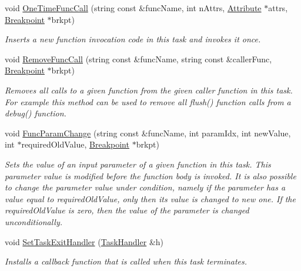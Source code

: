 \begin{DoxyCompactItemize}
void \hyperlink{class_model_1_1_task_ae0413fd63f38721da68b6c425f18feaf}{One\-Time\-Func\-Call} (string const \&func\-Name, int n\-Attrs, \hyperlink{class_common_1_1_attribute}{Attribute} $\ast$attrs, \hyperlink{class_common_1_1_breakpoint}{Breakpoint} $\ast$brkpt)
\begin{DoxyCompactList}\small\item\em Inserts a new function invocation code in this task and invokes it once. \end{DoxyCompactList}\item 
void \hyperlink{class_model_1_1_task_a6f5361d812cf7958d151736734762652}{Remove\-Func\-Call} (string const \&func\-Name, string const \&caller\-Func, \hyperlink{class_common_1_1_breakpoint}{Breakpoint} $\ast$brkpt)
\begin{DoxyCompactList}\small\item\em Removes all calls to a given function from the given caller function in this task. For example this method can be used to remove all flush() function calls from a debug() function. \end{DoxyCompactList}\item 
void \hyperlink{class_model_1_1_task_a09f3bb2f03a05d8d60fb391b0cb40249}{Func\-Param\-Change} (string const \&func\-Name, int param\-Idx, int new\-Value, int $\ast$required\-Old\-Value, \hyperlink{class_common_1_1_breakpoint}{Breakpoint} $\ast$brkpt)
\begin{DoxyCompactList}\small\item\em Sets the value of an input parameter of a given function in this task. This parameter value is modified before the function body is invoked. It is also possible to change the parameter value under condition, namely if the parameter has a value equal to required\-Old\-Value, only then its value is changed to new one. If the required\-Old\-Value is zero, then the value of the parameter is changed unconditionally. \end{DoxyCompactList}\item 
\hypertarget{class_model_1_1_task_a025e9649f68df2692157770f04ce6921}{void \hyperlink{class_model_1_1_task_a025e9649f68df2692157770f04ce6921}{Set\-Task\-Exit\-Handler} (\hyperlink{class_model_1_1_task_handler}{Task\-Handler} \&h)}\label{class_model_1_1_task_a025e9649f68df2692157770f04ce6921}

\begin{DoxyCompactList}\small\item\em Installs a callback function that is called when this task terminates. \end{DoxyCompactList}\end{DoxyCompactItemize}
